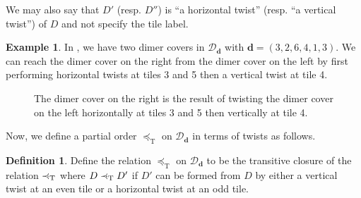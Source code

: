 \documentclass{amsart}
\theoremstyle{definition}
\newtheorem{definition}[theorem]{Definition}
\newtheorem{example}[theorem]{Example}
\newcommand{\precdot}{\prec\mathrel{\mkern-5mu}\mathrel{\cdot}}
\newcommand{\leqt}{\preceq_{\text{T}}}
\newcommand{\lessdott}{\precdot_{\text{T}}}
\begin{document}
We may also say that $D'$ (resp. $D''$) is ``a horizontal twist'' (resp. ``a vertical twist'') of $D$ and not specify the tile label. 

\begin{example}
In , we have two dimer covers in $\mathcal{D}_{\mathbf{d}}$ with $\mathbf{d} = (3,2,6,4,1,3)$. We can reach the dimer cover on the right from the dimer cover on the left by first performing horizontal twists at tiles 3 and 5 then a vertical twist at tile 4.

\begin{figure}[h]
    \centering
    \begin{center}
\qquad
{}
\end{center}
    \caption{The dimer cover on the right is the result of twisting the dimer cover on the left horizontally at tiles 3 and 5 then vertically at tile 4.}
    \label{fig:handvtwist}
\end{figure}
\end{example}

Now, we define a partial order $\leqt$ on $\mathcal{D}_{\mathbf{d}}$ in terms of twists as follows.

\begin{definition}\label{def:mdorder}
Define the relation $\leqt$ on $\mathcal{D}_{\mathbf{d}}$ to be the transitive closure of the relation $\lessdott$ where $D \lessdott D'$ if $D'$ can be formed from $D$ by either a vertical twist at an even tile or a horizontal twist at an odd tile.
\end{definition}
\end{document}
